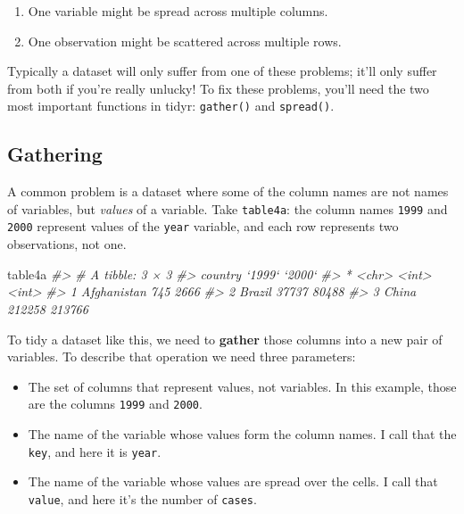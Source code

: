 \documentclass[]{book}
\newenvironment{Shaded}{\begin{snugshade}}{\end{snugshade}}
\newcommand{\CommentTok}[1]{\textcolor[rgb]{0.56,0.35,0.01}{\textit{{#1}}}}
\newcommand{\NormalTok}[1]{{#1}}
\begin{document}
\begin{enumerate}
\def\labelenumi{\arabic{enumi}.}
\item
  One variable might be spread across multiple columns.
\item
  One observation might be scattered across multiple rows.
\end{enumerate}

Typically a dataset will only suffer from one of these problems; it'll
only suffer from both if you're really unlucky! To fix these problems,
you'll need the two most important functions in tidyr: \texttt{gather()}
and \texttt{spread()}.

\subsection{Gathering}\label{gathering}

A common problem is a dataset where some of the column names are not
names of variables, but \emph{values} of a variable. Take
\texttt{table4a}: the column names \texttt{1999} and \texttt{2000}
represent values of the \texttt{year} variable, and each row represents
two observations, not one.

\begin{Shaded}
\begin{Highlighting}[]
\NormalTok{table4a}
\CommentTok{#> # A tibble: 3 × 3}
\CommentTok{#>       country `1999` `2000`}
\CommentTok{#> *       <chr>  <int>  <int>}
\CommentTok{#> 1 Afghanistan    745   2666}
\CommentTok{#> 2      Brazil  37737  80488}
\CommentTok{#> 3       China 212258 213766}
\end{Highlighting}
\end{Shaded}

To tidy a dataset like this, we need to \textbf{gather} those columns
into a new pair of variables. To describe that operation we need three
parameters:

\begin{itemize}
\item
  The set of columns that represent values, not variables. In this
  example, those are the columns \texttt{1999} and \texttt{2000}.
\item
  The name of the variable whose values form the column names. I call
  that the \texttt{key}, and here it is \texttt{year}.
\item
  The name of the variable whose values are spread over the cells. I
  call that \texttt{value}, and here it's the number of \texttt{cases}.
\end{itemize}
\end{document}
